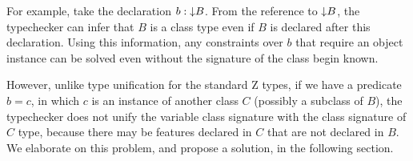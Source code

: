 For example, take the declaration $b : \mathord\downarrow B$. From the reference to
$\mathord\downarrow B$, the typechecker can infer that $B$ is a class type even if
$B$ is declared after this declaration. Using this information, any constraints
over $b$ that require an object instance can be solved even
without the signature of the class begin known.

However, unlike type unification for the standard Z types, if we have
a predicate $b = c$, in which $c$ is an instance of another class $C$
(possibly a subclass of $B$), the typechecker does not unify the
variable class signature with the class signature of $C$ type, because
there may be features declared in $C$ that are not declared in
$B$. We elaborate on this problem, and propose a solution, 
in the following section.

